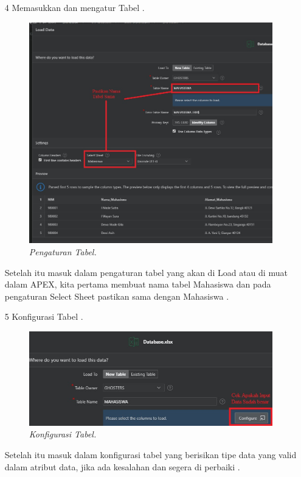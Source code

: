 \begin{enumerate}
\item[4]Memasukkan dan mengatur Tabel .
\begin{figure}[!htbp]
    \begin{center}
    \includegraphics[scale=0.4]{figures/3.jpg}
    \caption{\textit{Pengaturan Tabel.}}
    \end{center}
\end{figure}
\par Setelah itu masuk dalam pengaturan tabel yang akan di Load atau di muat dalam APEX, kita pertama membuat nama tabel Mahasiswa dan pada pengaturan Select Sheet pastikan sama dengan Mahasiswa .

\item[5]Konfigurasi Tabel .
\begin{figure}[!htbp]
    \begin{center}
    \includegraphics[scale=0.6]{figures/4.jpg}
    \caption{\textit{Konfigurasi Tabel.}}
    \end{center}
\end{figure}
\par Setelah itu masuk dalam konfigurasi tabel yang berisikan tipe data yang valid dalam atribut data, jika ada kesalahan dan segera di perbaiki .


\end{enumerate}
